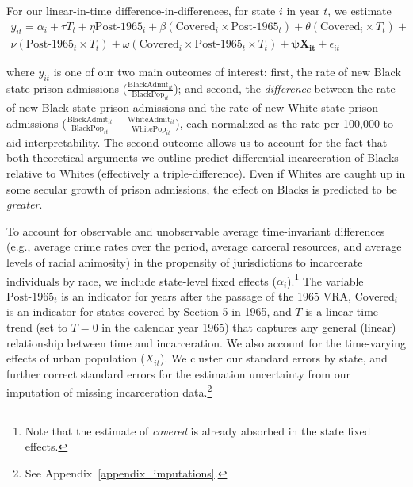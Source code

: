 \documentclass[12pt]{article}
\begin{document}
For our linear-in-time difference-in-differences, for state $i$ in year $t$, we estimate
\begin{align}
     y_{it} = \alpha_{i} + \tau T_{t} + \eta \text{Post-1965}_{i} + \beta  (\text{Covered}_{i} \times \text{Post-1965}_{t}) + \theta (\text{Covered}_{i} \times T_{t}) + \nonumber \\
      \nu (\text{Post-1965}_{t} \times T_{t}) + \omega (\text{Covered}_{i} \times \text{Post-1965}_{t} \times T_{t}) + \boldsymbol{\psi X_{it}}  + \epsilon_{it}  \label{equation_dind_linear}
\end{align}

where $y_{it}$ is one of our two main outcomes of interest: first, the rate of new Black state prison admissions ($\frac{\text{BlackAdmit}_{it}}{\text{BlackPop}_{it}}$); and second, the \emph{difference} between the rate of new Black state prison admissions and the rate of new White state prison admissions ($\frac{\text{BlackAdmit}_{it}}{\text{BlackPop}_{it}} - \frac{\text{WhiteAdmit}_{it}}{\text{WhitePop}_{it}}$), each normalized as the rate per 100,000 to aid interpretability. The second outcome allows us to account for the fact that both theoretical arguments we outline predict differential incarceration of Blacks relative to Whites (effectively a triple-difference).  Even if Whites are caught up in some secular growth of prison admissions, the effect on Blacks is predicted to be \emph{greater}.

To account for observable and unobservable average time-invariant differences (e.g., average crime rates over the period, average carceral resources, and average levels of racial animosity) in the propensity of jurisdictions to incarcerate individuals by race, we include state-level fixed effects ($\alpha_{i}$).\footnote{Note that the estimate of \emph{covered} is already absorbed in the state fixed effects.}  The variable $\text{Post-1965}_{t}$ is an indicator for years after the passage of the 1965 VRA, $\text{Covered}_{i}$ is an indicator for states covered by Section 5 in 1965, and $T$ is a linear time trend (set to $T=0$ in the calendar year 1965) that captures any general (linear) relationship between time and incarceration.  We also account for the time-varying effects of urban population ($X_{it}$).  We cluster our standard errors by state, and further correct standard errors for the estimation uncertainty from our imputation of missing incarceration data.\footnote{See Appendix~\ref{appendix_imputations}.}
\end{document}

